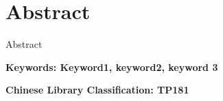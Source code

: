 \chapter*{Abstract}
Abstract

{\textbf{Keywords: Keyword1, keyword2, keyword 3}}

{\textbf{Chinese Library Classification: TP181}}